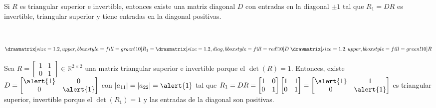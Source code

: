 \begin{frame}
	\begin{theorem}
		Si $R$ es triangular superior e invertible, entonces existe
		una matriz diagonal $D$ con entradas en la diagonal $\pm 1$ tal
		que $R_{1}=DR$ es invertible, triangular superior y tiene
		entradas en la diagonal positivas.

		\

		\begin{equation*}
			\drawmatrix[size=1.2, upper, bbox style={fill=green!10}]{R_{1}}=
			\drawmatrix[size=1.2, diag, bbox style={fill=red!10}]{D}\;
			\drawmatrix[size=1.2, upper, bbox style={fill=green!10}]{R}
		\end{equation*}
	\end{theorem}

	\begin{example}
		Sea
		\begin{math}
			R=
			\begin{bmatrix}
				1 & 1 \\
				0 & 1
			\end{bmatrix}\in\mathbb{R}^{2\times 2}
		\end{math}
		una matriz triangular superior e invertible porque el
		$\det\left(R\right)=1$.
		Entonces, existe
		\begin{math}
			D=
			\begin{bmatrix}
				\alert{1} & 0         \\
				0         & \alert{1}
			\end{bmatrix}
		\end{math}
		con
		\begin{math}
			\left|a_{11}\right|=
			\left|a_{22}\right|=
			\alert{1}
		\end{math}
		tal que
		\begin{math}
			R_{1}=
			DR=
			\begin{bmatrix}
				1 & 0 \\
				0 & 1
			\end{bmatrix}
			\begin{bmatrix}
				1 & 1 \\
				0 & 1
			\end{bmatrix}=
			\begin{bmatrix}
				\alert{1} & 1         \\
				0         & \alert{1}
			\end{bmatrix}
		\end{math}
		es triangular superior, invertible porque el
		$\det\left(R_{1}\right)=1$ y las entradas
		de la diagonal son \alert{positivas}.
	\end{example}
\end{frame}


